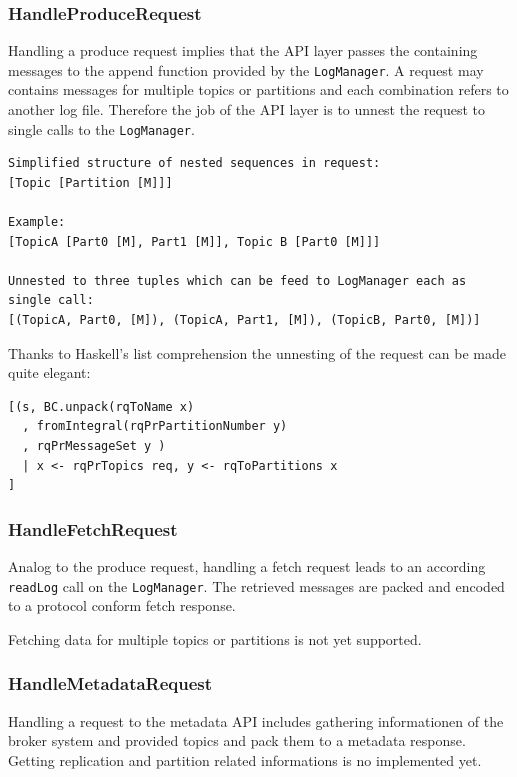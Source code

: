 \newpage
\subsubsection{HandleProduceRequest}
\label{subsec:broker-api-producerequest}
Handling a produce request implies that the API layer passes the containing
messages to the append function provided by the \lstinline{LogManager}. A
request may contains messages for multiple topics or partitions and each
combination refers to another log file. Therefore the job of the API layer is to unnest
the request to single calls to the \lstinline{LogManager}.
\begin{verbatim}
Simplified structure of nested sequences in request:
[Topic [Partition [M]]]

Example:
[TopicA [Part0 [M], Part1 [M]], Topic B [Part0 [M]]]

Unnested to three tuples which can be feed to LogManager each as single call:
[(TopicA, Part0, [M]), (TopicA, Part1, [M]), (TopicB, Part0, [M])]

\end{verbatim}

Thanks to Haskell's list comprehension the unnesting of the request can be made
quite elegant: \begin{lstlisting}[caption={Handling produce request}]
[(s, BC.unpack(rqToName x)
  , fromIntegral(rqPrPartitionNumber y)
  , rqPrMessageSet y ) 
  | x <- rqPrTopics req, y <- rqToPartitions x
]
\end{lstlisting}

\subsubsection{HandleFetchRequest}
\label{subsec:broker-api-fetchrequest}
Analog to the produce request, handling a fetch request leads to an according
\lstinline{readLog} call on the \lstinline{LogManager}. The retrieved messages
are packed and encoded to a protocol conform fetch response.

Fetching data for multiple topics or partitions is not yet supported.

\subsubsection{HandleMetadataRequest}
Handling a request to the metadata API includes gathering informationen of the
broker system and provided topics and pack them to a metadata response. Getting
replication and partition related informations is no implemented yet.

